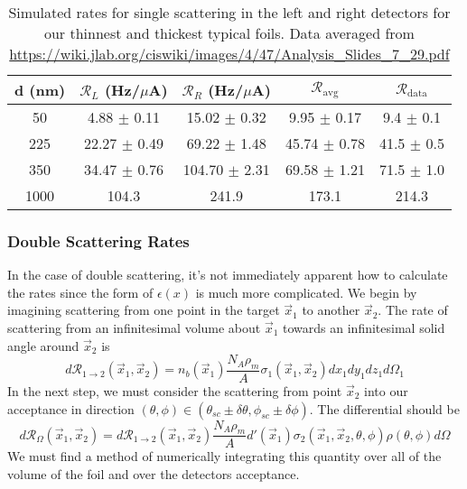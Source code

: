 \documentclass[11pt]{article}
\begin{document}
\begin{table} [h!]
 \centering
 \begin{tabular}{| c | c | c | c | c |} 
  \hline d (nm) & $\mathcal{R}_L$ (Hz/$\mu$A) & $\mathcal{R}_R$ (Hz/$\mu$A) & $\mathcal{R}_\mathrm{avg}$ & $\mathcal{R}_\mathrm{data}$ \\
  \hline 50 & 4.88 $\pm$ 0.11 & 15.02 $\pm$ 0.32 & 9.95 $\pm$ 0.17 & 9.4 $\pm$ 0.1\\
  \hline 225 & 22.27 $\pm$ 0.49 & 69.22 $\pm$ 1.48 & 45.74 $\pm$ 0.78 & 41.5 $\pm$ 0.5\\
  \hline 350 & 34.47 $\pm$ 0.76 & 104.70 $\pm$ 2.31 & 69.58 $\pm$ 1.21 & 71.5 $\pm$ 1.0\\  
  \hline 1000 & 104.3 & 241.9 & 173.1 & 214.3 \\
  \hline
 \end{tabular}
 \caption{Simulated rates for single scattering in the left and right detectors for our thinnest and thickest typical foils. Data averaged from \url{https://wiki.jlab.org/ciswiki/images/4/47/Analysis_Slides_7_29.pdf}}
 \label{table:SimulatedRates}
\end{table}

\subsubsection{Double Scattering Rates}

In the case of double scattering, it's not immediately apparent how to calculate the rates since the form of $\epsilon(x)$ is much more complicated. We begin by imagining scattering from one point in the target $\vec{x}_1$ to another $\vec{x}_2$. The rate of scattering from an infinitesimal volume about $\vec{x}_1$ towards an infinitesimal solid angle around $\vec{x}_2$ is 
\begin{equation}
d\mathcal{R}_{1\rightarrow2}(\vec{x}_1,\vec{x}_2) = n_b(\vec{x}_1) \frac{N_A\rho_m}{A} \sigma_1(\vec{x}_1,\vec{x}_2)dx_1dy_1dz_1d\Omega_1
\end{equation}
In the next step, we must consider the scattering from point $\vec{x}_2$ into our acceptance in direction $(\theta,\phi)\in(\theta_{sc}\pm\delta\theta,\phi_{sc}\pm\delta\phi)$. The differential should be
\begin{equation}
d\mathcal{R}_\Omega(\vec{x}_1,\vec{x}_2) = d\mathcal{R}_{1\rightarrow2}(\vec{x}_1,\vec{x}_2)\frac{N_A\rho_m}{A} d'(\vec{x}_1) \sigma_2(\vec{x}_1,\vec{x}_2,\theta,\phi) \rho(\theta,\phi) d\Omega
\end{equation}
We must find a method of numerically integrating this quantity over all of the volume of the foil and over the detectors acceptance. 
\end{document}
